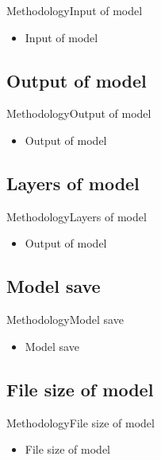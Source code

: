 \documentclass{beamer}
\begin{document}
\begin{CJK}{UTF8}{}
\begin{frame}{Methodology}{Input of model}
	\begin{itemize}
	\item{
		Input of model
	}
	
	
	\end{itemize}
\end{frame}

\subsection{Output of model}

\begin{frame}{Methodology}{Output of model}
	\begin{itemize}
	\item{
		Output of model
	}
	\end{itemize}
\end{frame}

\subsection{Layers of model}

\begin{frame}{Methodology}{Layers of model}
	\begin{itemize}
	\item{
		Output of model
	}
	\end{itemize}
\end{frame}

\subsection{Model save}

\begin{frame}{Methodology}{Model save}
	\begin{itemize}
	\item{
		Model save
	}
	\end{itemize}
\end{frame}

\subsection{File size of model}

\begin{frame}{Methodology}{File size of model}
	\begin{itemize}
	\item{
		File size of model
	}
	\end{itemize}
\end{frame}


\end{CJK}
\end{document}
